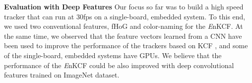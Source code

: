 \documentclass[10pt,twocolumn,letterpaper]{article}
\begin{document}
\textbf{Evaluation with Deep Features} Our focus so far was to build a
high speed tracker that can run at $30$fps on a single-board, embedded
system. To this end, we used two conventional features, fHoG and
color-naming for the {\it E}nKCF. At the same time, we observed that
the feature vectors learned from a CNN have been used to improve the
performance of the trackers based on KCF \cite{ma2015hierarchical,
  danelljan2015convolutional}, and some of the single-board, embedded
systems have GPUs. We believe that the performance of the {\it E}nKCF
could be also improved with deep convolutional features trained on ImageNet dataset.

\end{document}

